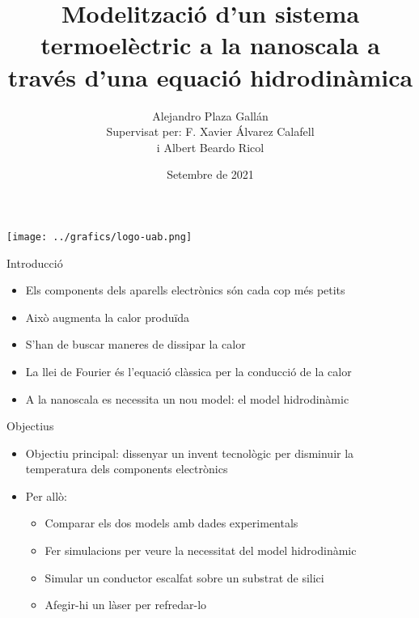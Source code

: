 \documentclass{beamer}
\title[Sistema termoel\`{e}ctric a la nanoscala]{{\textbf{Modelitzaci\'{o} d'un sistema termoel\`{e}ctric a la nanoscala a trav\'{e}s d'una equaci\'{o} hidrodin\`{a}mica}}}
\author[Alejandro Plaza Gall\'{a}n]{\huge{Alejandro Plaza Gall\'{a}n}\\\vspace{2mm}\Large{Supervisat per: F. Xavier \'{A}lvarez Calafell\\ i Albert Beardo Ricol}\vspace{-0.5cm}}
\date{Setembre de 2021}
\begin{document}
\begin{frame}
\titlepage
\centering
\texttt{[image: ../grafics/logo-uab.png]}\par\vspace{1cm}
\end{frame}

\begin{frame}{Introducci\'{o}}
\begin{itemize}
\item Els components dels aparells electr\`{o}nics s\'{o}n cada cop m\'{e}s petits
\pause
\vspace{5mm}
\item Aix\`{o} augmenta la calor produ\"{i}da
\pause
\vspace{5mm}
\item S'han de buscar maneres de dissipar la calor
\pause
\vspace{5mm}
\item La llei de Fourier \'{e}s l'equaci\'{o} cl\`{a}ssica per la conducci\'{o} de la calor
\pause
\vspace{5mm}
\item A la nanoscala es necessita un nou model: el model hidrodin\`{a}mic
\end{itemize}
\end{frame}

\begin{frame}{Objectius}
\begin{itemize}
\item Objectiu principal: dissenyar un invent tecnol\`{o}gic per disminuir la temperatura dels components electr\`{o}nics
\pause
\vspace{5mm}
\item Per all\`{o}:
\vspace{5mm}
\begin{itemize}
\item Comparar els dos models amb dades experimentals
\pause
\vspace{5mm}
\item Fer simulacions per veure la necessitat del model hidrodin\`{a}mic
\pause
\vspace{5mm}
\item Simular un conductor escalfat sobre un substrat de silici
\pause
\vspace{5mm}
\item Afegir-hi un l\`{a}ser per refredar-lo
\end{itemize}
\end{itemize}
\end{frame}
\end{document}
